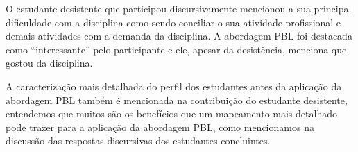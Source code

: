 O estudante desistente que participou discursivamente mencionou a sua
principal dificuldade com a disciplina como sendo conciliar o
sua atividade profissional e demais atividades com
a demanda da disciplina.
A abordagem \ac{PBL} foi destacada como ``interessante''
pelo participante e ele, apesar da desistência,
menciona que gostou da disciplina.

A caracterização mais detalhada do perfil dos estudantes
antes da aplicação da abordagem \ac{PBL} também é mencionada
na contribuição do estudante desistente, entendemos
que muitos são os benefícios que um mapeamento mais detalhado
pode trazer para a aplicação da abordagem \ac{PBL}, como
mencionamos na discussão das respostas discursivas dos estudantes
concluintes.
